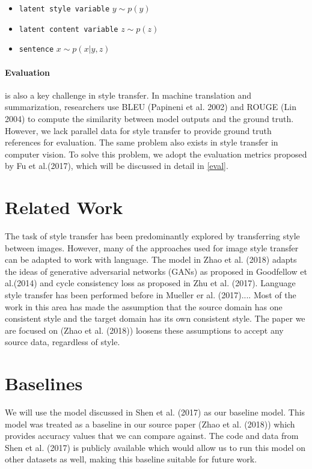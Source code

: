 \documentclass{article}
\begin{document}
\label{representation}
\begin{itemize}
\item \texttt{latent style variable} $y \sim p(y)$
\item \texttt{latent content variable} $z \sim p(z)$
\item \texttt{sentence} $x \sim p(x|y, z)$
\end{itemize}

\paragraph{Evaluation}is also a key challenge in style transfer. In machine translation and summarization, researchers use BLEU (Papineni et al. 2002) and ROUGE (Lin 2004) to compute the similarity between model outputs and the ground truth. However, we lack parallel data for style transfer to provide ground truth references for evaluation. The same problem also exists in style transfer in computer vision. To solve this problem, we adopt the evaluation metrics proposed by Fu et al.(2017), which will be discussed in detail in \ref{eval}.

\section{Related Work}
The task of style transfer has been predominantly explored by transferring style between images. However, many of the approaches used for image style transfer can be adapted to work with language. The model in Zhao et al. (2018) adapts the ideas of generative adversarial networks (GANs) as proposed in Goodfellow et al.(2014) and cycle consistency loss as proposed in Zhu et al. (2017).
Language style transfer has been performed before in Mueller er al. (2017)....
Most of the work in this area has made the assumption that the source domain has one consistent style and the target domain has its own consistent style. The paper we are focused on (Zhao et al. (2018)) loosens these assumptions to accept any source data, regardless of style. 


\section{Baselines}
We will use the model discussed in Shen et al. (2017) as our baseline model. This model was treated as a baseline in our source paper (Zhao et al. (2018)) which provides accuracy values that we can compare against. The code and data from Shen et al. (2017) is publicly available which would allow us to run this model on other datasets as well, making this baseline suitable for future work.
\end{document}
